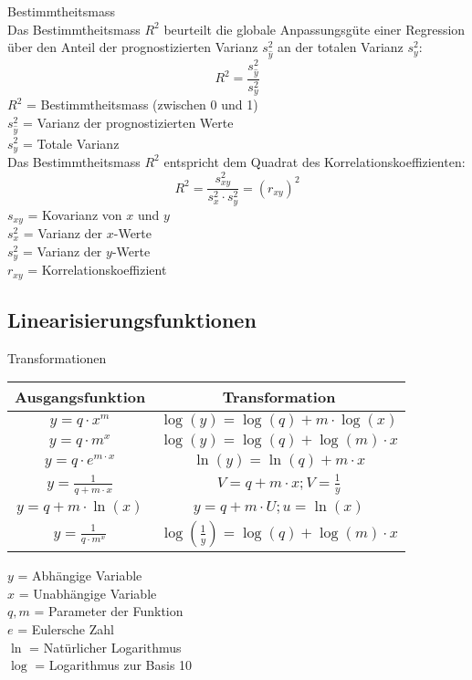 \begin{theorem}{Bestimmtheitsmass}\\
Das Bestimmtheitsmass $R^2$ beurteilt die globale Anpassungsgüte einer Regression über den Anteil der prognostizierten Varianz $s_{\hat{y}}^2$ an der totalen Varianz $s_y^2$:
$$
R^2=\frac{s_{\hat{y}}^2}{s_y^2}
$$
$R^2$ = Bestimmtheitsmass (zwischen 0 und 1)\\
$s_{\hat{y}}^2$ = Varianz der prognostizierten Werte\\
$s_y^2$ = Totale Varianz\\

Das Bestimmtheitsmass $R^2$ entspricht dem Quadrat des Korrelationskoeffizienten:
$$
R^2=\frac{s_{xy}^2}{s_x^2 \cdot s_y^2}=(r_{xy})^2
$$
$s_{xy}$ = Kovarianz von $x$ und $y$\\
$s_x^2$ = Varianz der $x$-Werte\\
$s_y^2$ = Varianz der $y$-Werte\\
$r_{xy}$ = Korrelationskoeffizient\\
\end{theorem}

\subsection{Linearisierungsfunktionen}
\begin{concept}{Transformationen}\\
\begin{center}
\begin{tabular}{|c|c|}
\hline
Ausgangsfunktion & Transformation \\
\hline
$y=q \cdot x^m$ & $\log(y)=\log(q)+m \cdot \log(x)$ \\
\hline
$y=q \cdot m^x$ & $\log(y)=\log(q)+\log(m) \cdot x$ \\
\hline
$y=q \cdot e^{m \cdot x}$ & $\ln(y)=\ln(q)+m \cdot x$ \\
\hline
$y=\frac{1}{q+m \cdot x}$ & $V=q+m \cdot x; V=\frac{1}{y}$ \\
\hline
$y=q+m \cdot \ln(x)$ & $y=q+m \cdot U; u=\ln(x)$ \\
\hline
$y=\frac{1}{q \cdot m^x}$ & $\log(\frac{1}{y})=\log(q)+\log(m) \cdot x$ \\
\hline
\end{tabular}
\end{center}
$y$ = Abhängige Variable\\
$x$ = Unabhängige Variable\\
$q, m$ = Parameter der Funktion\\
$e$ = Eulersche Zahl\\
$\ln$ = Natürlicher Logarithmus\\
$\log$ = Logarithmus zur Basis 10\\
\end{concept}

